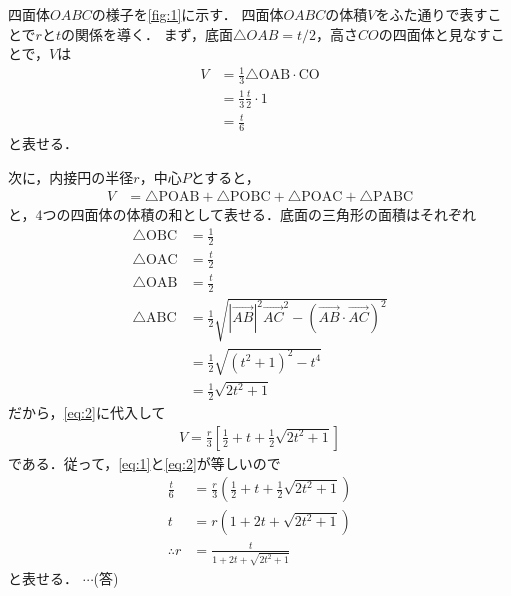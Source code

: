 \begin{multicols}{2}
  四面体$OABC$の様子を\cref{fig:1}に示す．
  四面体$OABC$の体積$V$をふた通りで表すことで$r$と$t$の関係を導く．
  まず，底面$\triangle OAB=t/2$，高さ$CO$の四面体と見なすことで，$V$は
  \begin{align}
    V
     & = \frac{1}{3} \triangle \mathrm{OAB}\cdot \mathrm{CO} \nonumber \\
     & = \frac{1}{3} \frac{t}{2} \cdot 1 \nonumber                     \\
     & = \frac{t}{6} \label{eq:1}
  \end{align}
  と表せる．

  次に，内接円の半径$r$，中心$P$とすると，
  \begin{align}
    V
     & = \triangle \mathrm{POAB} + \triangle \mathrm{POBC} + \triangle \mathrm{POAC} +  \triangle \mathrm{PABC} \label{eq:2}
  \end{align}
  と，$4$つの四面体の体積の和として表せる．底面の三角形の面積はそれぞれ
  \begin{align*}
    \triangle \mathrm{OBC} & = \frac{1}{2}                                                        \\
    \triangle \mathrm{OAC} & = \frac{t}{2}                                                        \\
    \triangle \mathrm{OAB} & = \frac{t}{2}                                                        \\
    \triangle \mathrm{ABC} & = \frac{1}{2}\sqrt{|\vec{AB}|^2\vec{AC}^2-(\vec{AB}\cdot\vec{AC})^2} \\
                           & = \frac{1}{2}\sqrt{(t^2+1)^2-t^4}                                    \\
                           & = \frac{1}{2}\sqrt{2t^2+1}
  \end{align*}
  だから，\cref{eq:2}に代入して
  \begin{align}
    V = \frac{r}{3}\left[\frac{1}{2}+t+\frac{1}{2}\sqrt{2t^2+1}\right]\label{eq:3}
  \end{align}
  である．従って，\cref{eq:1}と\cref{eq:2}が等しいので
  \begin{align*}
    \frac{t}{6}  & = \frac{r}{3} \left( \frac{1}{2} + t + \frac{1}{2} \sqrt{2t^2+1} \right) \\
    t            & = r (1 + 2t + \sqrt{2t^2+1})                                             \\
    \therefore r & = \frac{t}{1+2t+\sqrt{2t^2+1}}
  \end{align*}
  と表せる．  $\cdots$(答)


\end{multicols}
